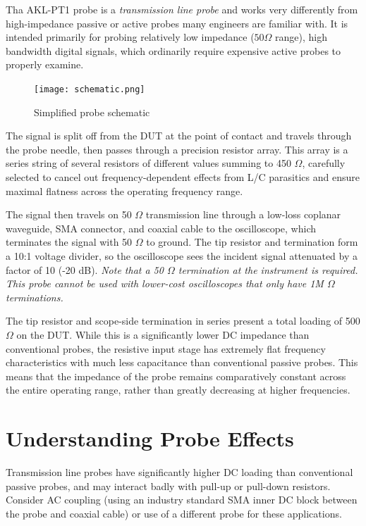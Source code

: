 \documentclass[11pt]{article}
\begin{document}
Tha AKL-PT1 probe is a \emph{transmission line probe} and works very differently from high-impedance passive or active
probes many engineers are familiar with. It is intended primarily for probing relatively low impedance ($50 \Omega$
range), high bandwidth digital signals, which ordinarily require expensive active probes to properly examine.

\begin{figure}[h]
\centering
\texttt{[image: schematic.png]}
\caption{Simplified probe schematic}
\label{schematic}
\end{figure}

The signal is split off from the DUT at the point of contact and travels through the probe needle, then passes through
a precision resistor array. This array is a series string of several resistors of different values summing to
450 $\Omega$, carefully selected to cancel out frequency-dependent effects from L/C parasitics and ensure maximal
flatness across the operating frequency range.

The signal then travels on 50 $\Omega$ transmission line through a low-loss coplanar waveguide, SMA connector, and
coaxial cable to the oscilloscope, which terminates the signal with 50 $\Omega$ to ground. The tip resistor and
termination form a 10:1 voltage divider, so the oscilloscope sees the incident signal attenuated by a factor of 10 (-20
dB). \emph{Note that a 50 $\Omega$ termination at the instrument is required. This probe cannot be used with lower-cost
oscilloscopes that only have 1M $\Omega$ terminations.}

The tip resistor and scope-side termination in series present a total loading of 500 $\Omega$ on the DUT. While this is
a significantly lower DC impedance than conventional probes, the resistive input stage has extremely flat frequency
characteristics with much less capacitance than conventional passive probes. This means that the impedance of the probe
remains comparatively constant across the entire operating range, rather than greatly decreasing at higher frequencies.

\section{Understanding Probe Effects}

Transmission line probes have significantly higher DC loading than conventional passive probes, and may interact badly
with pull-up or pull-down resistors. Consider AC coupling (using an industry standard SMA inner DC block between the
probe and coaxial cable) or use of a different probe for these applications.
\end{document}
